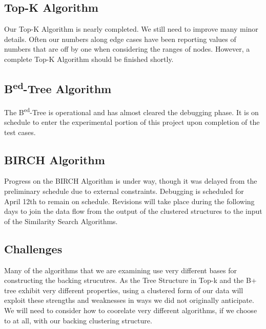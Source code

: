 \documentclass[pdftex,12pt,letter]{article}
\begin{document}
\subsection{Top-K Algorithm}
Our Top-K Algorithm is nearly completed. We still need to improve many minor details. Often our numbers along edge cases have been reporting values of numbers that are off by one when considering the ranges of nodes. However, a complete Top-K Algorithm should be finished shortly.
\subsection{B\textsuperscript{ed}-Tree Algorithm}
The B\textsuperscript{ed}-Tree is operational and has almost cleared the debugging phase. It is on schedule to enter the experimental portion of this project upon completion of the test cases.
\subsection{BIRCH Algorithm}
Progress on the BIRCH Algorithm is under way, though it was delayed from the preliminary schedule due to external constraints. Debugging is scheduled for April 12th to remain on schedule. Revisions will take place during the following days to join the data flow from the output of the clustered structures to the input of the Similarity Search Algorithms.

\subsection{Challenges}
Many of the algorithms that we are examining use very different bases for constructing the backing strucutres. As the Tree Structure in Top-k and the B+ tree exhibit very different properties, using a clustered form of our data will exploit these strengths and weaknesses in ways we did not originally anticipate. We will need to consider how to coorelate very different algorithms, if we choose to at all, with our backing clustering structure. 
\end{document}
